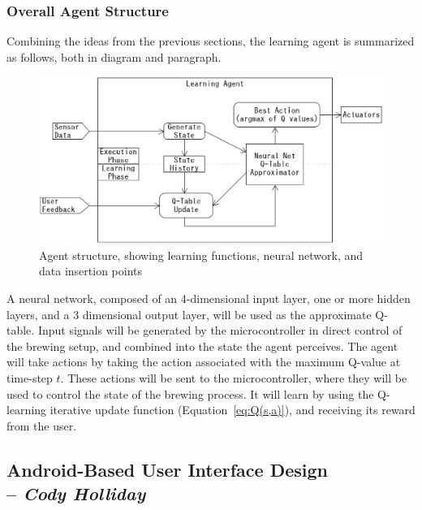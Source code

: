\documentclass[draftclsnofoot,onecolumn,letterpaper,10pt]{IEEEtran}
\begin{document}
\subsubsection{Overall Agent Structure}
Combining the ideas from the previous sections, the learning agent is summarized as follows, both in diagram and paragraph.

\begin{figure}[h]
\begin{center}
	\caption{Agent structure, showing learning functions, neural network, and data insertion points \label{fig:AgentStructure}}
	\includegraphics[width=\linewidth]{totalagent.eps}
\end{center}
\end{figure}

A neural network, composed of an 4-dimensional input layer, one or more hidden layers, and a 3 dimensional output layer, will be used as the approximate Q-table.
Input signals will be generated by the microcontroller in direct control of the brewing setup, and combined into the state the agent perceives.
The agent will take actions by taking the action associated with the maximum Q-value at time-step $t$.
These actions will be sent to the microcontroller, where they will be used to control the state of the brewing process.
It will learn by using the Q-learning iterative update function (Equation~\ref{eq:Q(s,a)}), and receiving its reward from the user.


\subsection{Android-Based User Interface Design \\ -- \textbf{\textit{Cody Holliday}}}\label{sec:android}
\end{document}
